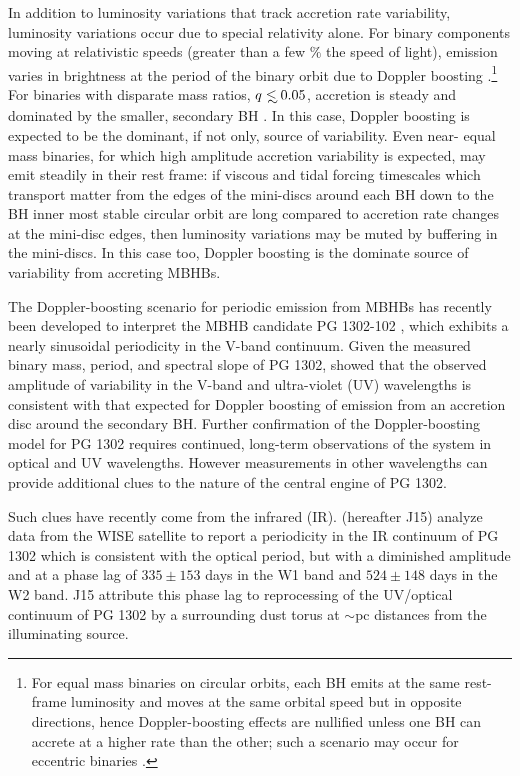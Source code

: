 In addition to luminosity variations that track accretion rate variability,
luminosity variations occur due to special relativity alone. For binary
components moving at relativistic speeds (greater than a few $\%$ the speed of
light), emission varies in brightness at the period of the binary orbit due to
Doppler boosting \citep{PG1302MNRAS:2015a, PG1302Nature:2015b}.\footnote{For
equal mass binaries on circular orbits, each BH emits at the same rest-frame
luminosity and moves at the same orbital speed but in opposite directions,
hence Doppler-boosting effects are nullified unless one BH can accrete at a
higher rate than the other; such a scenario may occur for eccentric binaries
\citep{MunozLai:2016}.}  For binaries with disparate mass ratios, $q \lsim
0.05$, accretion is steady and dominated by the smaller, secondary BH
\citep{DHM:2013:MNRAS, Farris:2014}. In this case, Doppler boosting is
expected to be the dominant, if not only, source of variability. Even near-
equal mass binaries, for which high amplitude accretion variability is
expected, may emit steadily in their rest frame: if viscous and tidal forcing
timescales which transport matter from the edges of the mini-discs around each
BH down to the BH inner most stable circular orbit are long compared to
accretion rate changes at the mini-disc edges, then luminosity variations may
be muted by buffering in the mini-discs. In this case too, Doppler boosting is
the dominate source of variability from accreting MBHBs.



The Doppler-boosting scenario for periodic emission from MBHBs has recently
been developed to interpret the MBHB candidate PG 1302-102
\citep{Graham+2015a}, which exhibits a nearly sinusoidal periodicity in the
V-band continuum. Given the measured binary mass, period, and spectral slope
of PG 1302, \cite{PG1302Nature:2015b} showed that the observed amplitude of
variability in the V-band and ultra-violet (UV) wavelengths is consistent with
that expected for Doppler boosting of emission from an accretion disc around
the secondary BH. Further confirmation of the Doppler-boosting model for PG
1302 requires continued, long-term observations of the system in optical and
UV wavelengths. However measurements in other wavelengths can provide
additional clues to the nature of the central engine of PG 1302.

Such clues have recently come from the infrared (IR). \cite{Jun:2015}
(hereafter J15) analyze data from the WISE satellite to report a periodicity
in the IR continuum of PG 1302 which is consistent with the optical period,
but with a diminished amplitude and at a phase lag of $335 \pm 153$ days in
the W1 band and $524 \pm 148$ days in the W2 band. J15 attribute this phase
lag to reprocessing of the UV/optical continuum of PG 1302 by a surrounding
dust torus at $\sim$pc distances from the illuminating source.

